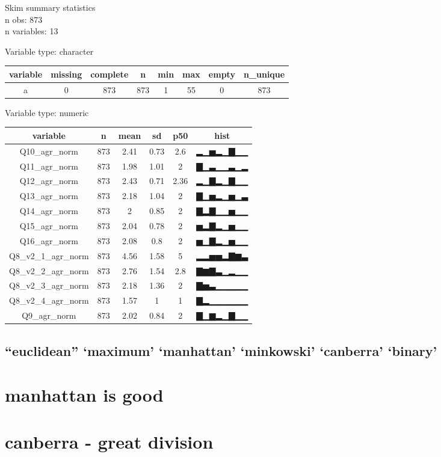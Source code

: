\documentclass[]{article}
\begin{document}
Skim summary statistics\\
n obs: 873\\
n variables: 13

Variable type: character

\begin{longtable}[c]{@{}cccccccc@{}}
\toprule
variable & missing & complete & n & min & max & empty &
n\_unique\tabularnewline
\midrule
\endhead
a & 0 & 873 & 873 & 1 & 55 & 0 & 873\tabularnewline
\bottomrule
\end{longtable}

Variable type: numeric

\begin{longtable}[c]{@{}cccccc@{}}
\toprule
variable & n & mean & sd & p50 & hist\tabularnewline
\midrule
\endhead
Q10\_agr\_norm & 873 & 2.41 & 0.73 & 2.6 & ▂▁▅▂▁▇▁▁\tabularnewline
Q11\_agr\_norm & 873 & 1.98 & 1.01 & 2 & ▇▁▃▁▁▃▁▂\tabularnewline
Q12\_agr\_norm & 873 & 2.43 & 0.71 & 2.36 & ▂▁▇▂▁▇▁▁\tabularnewline
Q13\_agr\_norm & 873 & 2.18 & 1.04 & 2 & ▇▁▅▂▁▅▁▃\tabularnewline
Q14\_agr\_norm & 873 & 2 & 0.85 & 2 & ▇▂▇▁▁▅▁▁\tabularnewline
Q15\_agr\_norm & 873 & 2.04 & 0.78 & 2 & ▅▂▇▂▁▅▁▁\tabularnewline
Q16\_agr\_norm & 873 & 2.08 & 0.8 & 2 & ▅▁▇▂▁▅▁▁\tabularnewline
Q8\_v2\_1\_agr\_norm & 873 & 4.56 & 1.58 & 5 & ▂▂▅▅▂▇▆▃\tabularnewline
Q8\_v2\_2\_agr\_norm & 873 & 2.76 & 1.54 & 2.8 & ▇▆▇▃▁▂▁▁\tabularnewline
Q8\_v2\_3\_agr\_norm & 873 & 2.18 & 1.36 & 2 & ▇▅▃▁▁▁▁▁\tabularnewline
Q8\_v2\_4\_agr\_norm & 873 & 1.57 & 1 & 1 & ▇▂▁▁▁▁▁▁\tabularnewline
Q9\_agr\_norm & 873 & 2.02 & 0.84 & 2 & ▇▁▆▂▁▇▁▁\tabularnewline
\bottomrule
\end{longtable}

\subsection{\texorpdfstring{``euclidean'' `maximum' `manhattan'
`minkowski' `canberra'
`binary'}{euclidean maximum manhattan minkowski canberra binary}}\label{euclidean-maximum-manhattan-minkowski-canberra-binary}

\section{manhattan is good}\label{manhattan-is-good}

\section{canberra - great division}\label{canberra---great-division}
\end{document}
